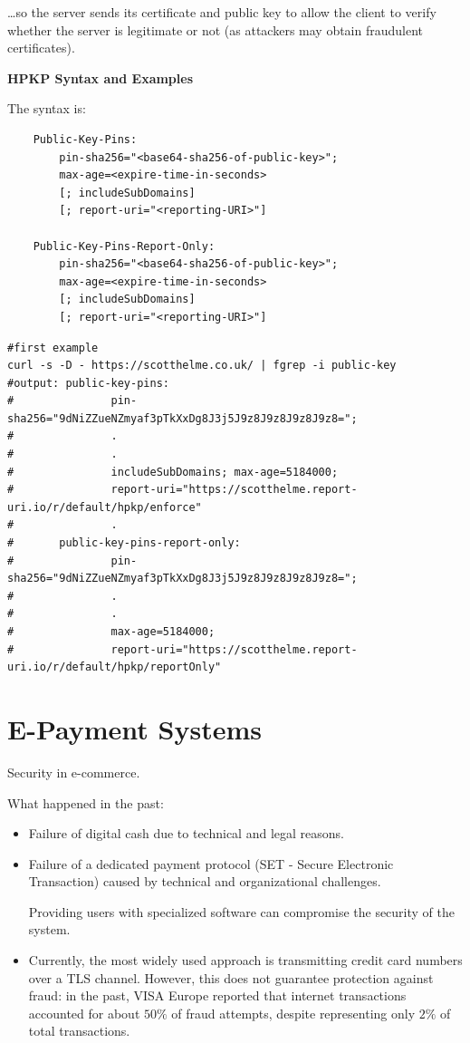 …so the server sends its certificate and public key to allow the client to verify whether the server is legitimate or not (as attackers may obtain fraudulent certificates).

\begin{center}
    \textbf{HPKP Syntax and Examples}
\end{center}

The syntax is:
\begin{verbatim}
    Public-Key-Pins:
        pin-sha256="<base64-sha256-of-public-key>";
        max-age=<expire-time-in-seconds>
        [; includeSubDomains]
        [; report-uri="<reporting-URI>"]

    Public-Key-Pins-Report-Only:
        pin-sha256="<base64-sha256-of-public-key>";
        max-age=<expire-time-in-seconds>
        [; includeSubDomains]
        [; report-uri="<reporting-URI>"]
\end{verbatim}

\begin{lstlisting}[style=bashStyle]
#first example
curl -s -D - https://scotthelme.co.uk/ | fgrep -i public-key 
#output: public-key-pins:
#               pin-sha256="9dNiZZueNZmyaf3pTkXxDg8J3j5J9z8J9z8J9z8J9z8=";
#               .
#               .
#               includeSubDomains; max-age=5184000;
#               report-uri="https://scotthelme.report-uri.io/r/default/hpkp/enforce"
#               .
#       public-key-pins-report-only:
#               pin-sha256="9dNiZZueNZmyaf3pTkXxDg8J3j5J9z8J9z8J9z8J9z8=";
#               .
#               .
#               max-age=5184000;
#               report-uri="https://scotthelme.report-uri.io/r/default/hpkp/reportOnly"

\end{lstlisting}

\section{E-Payment Systems}
\begin{center}
    Security in e-commerce.
\end{center}

What happened in the past:
\begin{itemize}
    \item Failure of digital cash due to technical and legal reasons.
    \item Failure of a dedicated payment protocol (SET - Secure Electronic Transaction) caused by technical and organizational challenges.
    \begin{tcolorbox}[colback=red!10!white, colframe=red!70!black, coltitle=white, title=Beware]
    Providing users with specialized software can compromise the security of the system.
    \end{tcolorbox}
    \item Currently, the most widely used approach is transmitting credit card numbers over a TLS channel. However, this does not guarantee protection against fraud: in the past, VISA Europe reported that internet transactions accounted for about $50\%$ of fraud attempts, despite representing only $2\%$ of total transactions.
\end{itemize}

